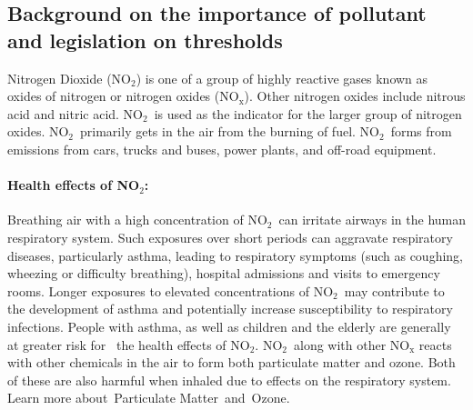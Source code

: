 \documentclass[a4paper,12pt,reqno]{article}
\begin{document}
\vspace{-0.5cm}
\subsection*{Background on the importance of pollutant and legislation on thresholds}
    Nitrogen Dioxide (NO$_2$) is one of a group of 
    highly reactive gases known as oxides of nitrogen 
    or nitrogen oxides (NO$_{\mathrm{x}}$). Other 
    nitrogen oxides include nitrous acid and nitric 
    acid. NO$_2$ is used as the indicator for the 
    larger group of nitrogen oxides. 
    NO$_2$ primarily gets in the air from the burning of fuel. 
    NO$_2$ forms from emissions from cars, trucks and buses, 
    power plants, and off-road equipment.
    \paragraph{Health effects of NO$_2$:}
    Breathing air with a high concentration of NO$_2$ can irritate airways in the human respiratory system. Such exposures over short periods can aggravate respiratory diseases, particularly asthma, leading to respiratory symptoms (such as coughing, wheezing or difficulty breathing), hospital admissions and visits to emergency rooms. Longer exposures to elevated concentrations of NO$_2$ may contribute to the development of asthma and potentially increase susceptibility to respiratory infections. People with asthma, as well as children and the elderly are generally at greater risk for  the health effects of NO$_2$.
    NO$_2$ along with other NO$_{\mathrm{x}}$ reacts with other chemicals in the air to form both particulate matter and ozone. Both of these are also harmful when inhaled due to effects on the respiratory system.
    Learn more about Particulate Matter and Ozone.



\vspace{-0.5cm}
\end{document}

